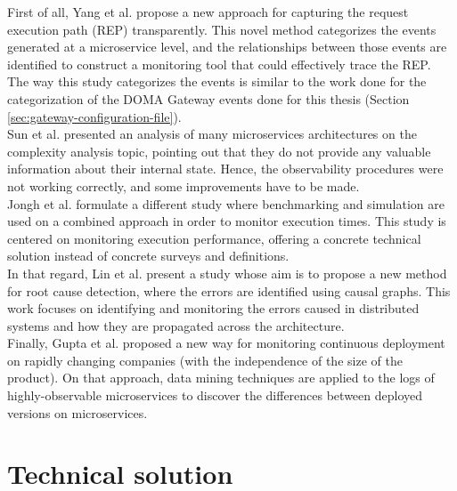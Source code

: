 \documentclass[english, 12pt, a4paper, sci, utf8, a-1b, online]{aaltothesis}
\begin{document}
First of all, Yang et al. \cite{yang2018transparently} propose a new approach for capturing the request execution path (REP) transparently. This novel method categorizes the events generated at a microservice level, and the relationships between those events are identified to construct a monitoring tool that could effectively trace the REP. The way this study categorizes the events is similar to the work done for the categorization of the DOMA Gateway events done for this thesis (Section \ref{sec:gateway-configuration-file}).\\

Sun et al. \cite{sun2018constraint} presented an analysis of many microservices architectures on the complexity analysis topic, pointing out that they do not provide any valuable information about their internal state. Hence, the observability procedures were not working correctly, and some improvements have to be made.\\

Jongh et al.\cite{johng2018estimating} formulate a different study where benchmarking and simulation are used on a combined approach in order to monitor execution times. This study is centered on monitoring execution performance, offering a concrete technical solution instead of concrete surveys and definitions.\\

In that regard, Lin et al. \cite{lin2018microscope} present a study whose aim is to propose a new method for root cause detection, where the errors are identified using causal graphs. This work focuses on identifying and monitoring the errors caused in distributed systems and how they are propagated across the architecture.\\

Finally, Gupta et al. \cite{gupta2018runtime} proposed a new way for monitoring continuous deployment on rapidly changing companies (with the independence of the size of the product). On that approach, data mining techniques are applied to the logs of highly-observable microservices to discover the differences between deployed versions on microservices.\\

\clearpage
\section{Technical solution}
\label{sec:technical-solution}

\end{document}
